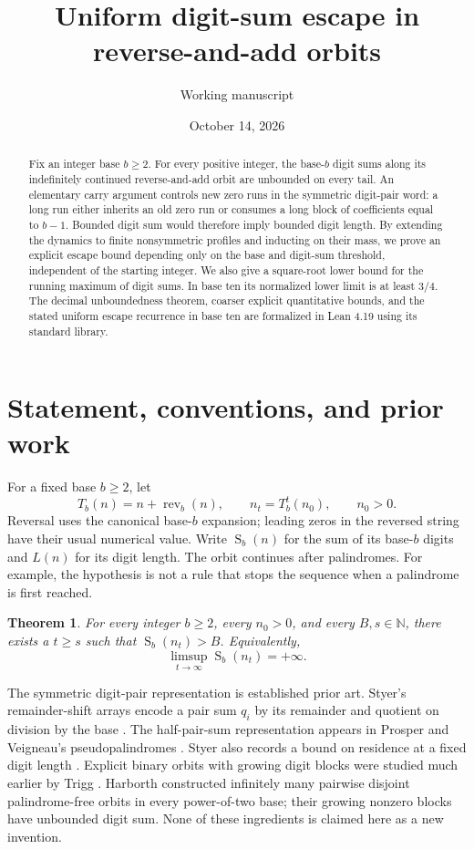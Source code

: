 \documentclass[11pt]{article}
\title{Uniform digit-sum escape in reverse-and-add orbits}
\author{Working manuscript}
\date{October 14, 2026}
\newtheorem{theorem}{Theorem}
\newcommand{\rev}{\operatorname{rev}}
\newcommand{\ds}{\operatorname{S}}
\begin{document}
\maketitle
\begin{abstract}
Fix an integer base $b\geq2$. For every positive integer, the base-$b$
digit sums along its indefinitely continued reverse-and-add orbit are
unbounded on every tail. An elementary carry argument controls new zero
runs in the symmetric digit-pair word: a long run either inherits an old
zero run or consumes a long block of coefficients equal to $b-1$.
Bounded digit sum would therefore imply bounded digit length. By extending
the dynamics to finite nonsymmetric profiles and inducting on their mass,
we prove an explicit escape bound depending only on the base and digit-sum
threshold, independent of the starting integer. We also give a square-root
lower bound for the running maximum of digit sums. In base ten its normalized lower limit is at least
$3/4$. The decimal unboundedness theorem, coarser explicit quantitative
bounds, and the stated uniform escape recurrence in base ten are
formalized in Lean 4.19 using its standard library.
\end{abstract}

\section{Statement, conventions, and prior work}
For a fixed base $b\geq2$, let
\[
 T_b(n)=n+\rev_b(n),\qquad n_t=T_b^t(n_0),\qquad n_0>0.
\]
Reversal uses the canonical base-$b$ expansion; leading zeros in the
reversed string have their usual numerical value. Write $\ds_b(n)$ for
the sum of its base-$b$ digits and $L(n)$ for its digit length. The orbit
continues after palindromes. For example, the hypothesis is not a rule
that stops the sequence when a palindrome is first reached.

\begin{theorem}\label{thm:main}
For every integer $b\geq2$, every $n_0>0$, and every $B,s\in\mathbb N$,
there exists a $t\geq s$ such that $\ds_b(n_t)>B$. Equivalently,
\[
 \limsup_{t\to\infty}\ds_b(n_t)=+\infty.
\]
\end{theorem}

The symmetric digit-pair representation is established prior art.
Styer's remainder-shift arrays encode a pair sum $q_i$ by its remainder
and quotient on division by the base \cite[Section 2]{styer}.
The half-pair-sum representation appears in Prosper and Veigneau's
pseudopalindromes \cite[Section 4.1]{pvpreprint}. Styer also records a
bound on residence at a fixed digit length \cite[p.~6]{styer}.
Explicit binary orbits with growing digit blocks were studied much
earlier by Trigg \cite{trigg}. Harborth \cite{harborth} constructed infinitely
many pairwise disjoint palindrome-free orbits in every power-of-two base;
their growing nonzero blocks have unbounded digit sum. None of these
ingredients is claimed here as a new invention.
\end{document}
